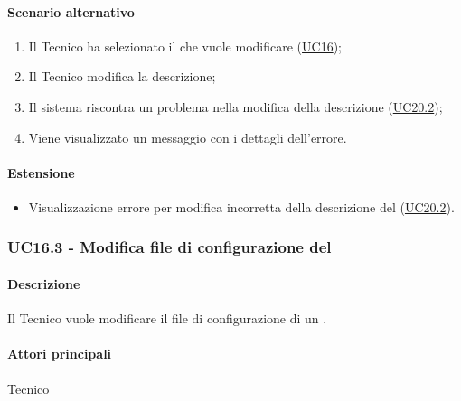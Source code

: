 \paragraph*{Scenario alternativo}
\begin{enumerate}
  \item Il Tecnico ha selezionato il  che vuole modificare (\hyperref[UC16]{UC16});
  \item Il Tecnico modifica la descrizione;
  \item Il sistema riscontra un problema nella modifica della descrizione (\hyperref[UC20point2]{UC20.2});
  \item Viene visualizzato un messaggio con i dettagli dell'errore.
\end{enumerate}

\paragraph{Estensione}
\begin{itemize}
  \item Visualizzazione errore per modifica incorretta della descrizione del  (\hyperref[UC20point2]{UC20.2}).
\end{itemize}


\subsubsection{UC16.3 - Modifica file di configurazione del }\label{UC16point3}
\paragraph*{Descrizione}
Il Tecnico vuole modificare il file di configurazione di un .

\paragraph*{Attori principali}
Tecnico

